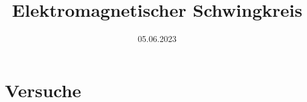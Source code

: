 
\usepackage{subfiles}

\title{Elektromagnetischer Schwingkreis}
\date{05.06.2023}


\maketitle


\newpage

\newpage
\part{Versuche}

\newpage

\newpage

